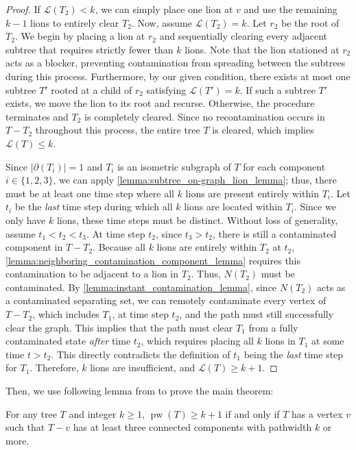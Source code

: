\documentclass[a4paper,UKenglish,cleveref, autoref, thm-restate]{lipics-v2021}
\begin{document}
\begin{proof}
If $\mathcal{L}(T_2) < k$, we can simply place one lion at $v$ and use the remaining $k-1$ lions to entirely clear $T_2$. Now, assume $\mathcal{L}(T_2) = k$. Let $r_2$ be the root of $T_2$. We begin by placing a lion at $r_2$ and sequentially clearing every adjacent subtree that requires strictly fewer than $k$ lions. Note that the lion stationed at $r_2$ acts as a blocker, preventing contamination from spreading between the subtrees during this process. Furthermore, by our given condition, there exists at most one subtree $T'$ rooted at a child of $r_2$ satisfying $\mathcal{L}(T') = k$. If such a subtree $T'$ exists, we move the lion to its root and recurse. Otherwise, the procedure terminates and $T_2$ is completely cleared. Since no recontamination occurs in $T - T_2$ throughout this process, the entire tree $T$ is cleared, which implies $\mathcal{L}(T)\leq k$.

Since $|\partial(T_i)|=1$ and $T_i$ is an isometric subgraph of $T$ for each component $i \in \{1, 2, 3\}$, we can apply \cref{lemma:subtree_on-graph_lion_lemma}; thus, there must be at least one time step where all $k$ lions are present entirely within $T_i$. Let $t_i$ be the \emph{last} time step during which all $k$ lions are located within $T_i$. Since we only have $k$ lions, these time steps must be distinct. Without loss of generality, assume $t_1 < t_2 < t_3$.
At time step $t_2$, since $t_3 > t_2$, there is still a contaminated component in $T - T_2$. Because all $k$ lions are entirely within $T_2$ at $t_2$, \cref{lemma:neighboring_contamination_component_lemma} requires this contamination to be adjacent to a lion in $T_2$. Thus, $N(T_2)$ must be contaminated.
By \cref{lemma:instant_contamination_lemma}, since $N(T_2)$ acts as a contaminated separating set, we can remotely contaminate every vertex of $T - T_2$, which includes $T_1$, at time step $t_2$, and the path must still successfully clear the graph. This implies that the path must clear $T_1$ from a fully contaminated state \emph{after} time $t_2$, which requires placing all $k$ lions in $T_1$ at some time $t > t_2$. This directly contradicts the definition of $t_1$ being the \emph{last} time step for $T_1$. Therefore, $k$ lions are insufficient, and $\mathcal{L}(T) \ge k+1$.
\end{proof}

Then, we use following lemma from \cite{takahashi1994minimal} to prove the main theorem:

\begin{lemma}\label{lemma:pathwidth_lemma}
For any tree $T$ and integer $k \geq 1$, $\operatorname{pw}(T) \geq k+1$ if and only if $T$ has a vertex $v$ such that $T - v$ has at least three connected components with pathwidth $k$ or more.
\end{lemma}
\end{document}
